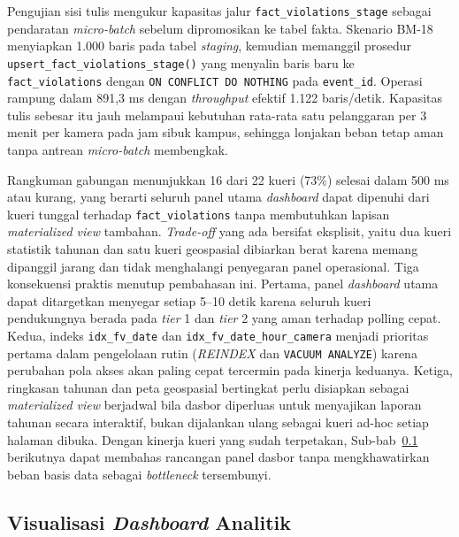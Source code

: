 Pengujian sisi tulis mengukur kapasitas jalur \texttt{fact\_violations\_stage} sebagai pendaratan \textit{micro-batch} sebelum dipromosikan ke tabel fakta. Skenario BM-18 menyiapkan 1.000 baris pada tabel \textit{staging}, kemudian memanggil prosedur \texttt{upsert\_fact\_violations\_stage()} yang menyalin baris baru ke \texttt{fact\_violations} dengan \texttt{ON CONFLICT DO NOTHING} pada \texttt{event\_id}. Operasi rampung dalam 891,3 ms dengan \textit{throughput} efektif 1.122 baris/detik. Kapasitas tulis sebesar itu jauh melampaui kebutuhan rata-rata satu pelanggaran per 3 menit per kamera pada jam sibuk kampus, sehingga lonjakan beban tetap aman tanpa antrean \textit{micro-batch} membengkak.

Rangkuman gabungan menunjukkan 16 dari 22 kueri (73\%) selesai dalam 500 ms atau kurang, yang berarti seluruh panel utama \textit{dashboard} dapat dipenuhi dari kueri tunggal terhadap \texttt{fact\_violations} tanpa membutuhkan lapisan \textit{materialized view} tambahan. \textit{Trade-off} yang ada bersifat eksplisit, yaitu dua kueri statistik tahunan dan satu kueri geospasial dibiarkan berat karena memang dipanggil jarang dan tidak menghalangi penyegaran panel operasional. Tiga konsekuensi praktis menutup pembahasan ini. Pertama, panel \textit{dashboard} utama dapat ditargetkan menyegar setiap 5--10 detik karena seluruh kueri pendukungnya berada pada \textit{tier} 1 dan \textit{tier} 2 yang aman terhadap polling cepat. Kedua, indeks \texttt{idx\_fv\_date} dan \texttt{idx\_fv\_date\_hour\_camera} menjadi prioritas pertama dalam pengelolaan rutin (\textit{REINDEX} dan \texttt{VACUUM ANALYZE}) karena perubahan pola akses akan paling cepat tercermin pada kinerja keduanya. Ketiga, ringkasan tahunan dan peta geospasial bertingkat perlu disiapkan sebagai \textit{materialized view} berjadwal bila dasbor diperluas untuk menyajikan laporan tahunan secara interaktif, bukan dijalankan ulang sebagai kueri ad-hoc setiap halaman dibuka. Dengan kinerja kueri yang sudah terpetakan, Sub-bab~\ref{subsec:visualisasi-dashboard} berikutnya dapat membahas rancangan panel dasbor tanpa mengkhawatirkan beban basis data sebagai \textit{bottleneck} tersembunyi.


\subsection{Visualisasi \textit{Dashboard} Analitik}
\label{subsec:visualisasi-dashboard}

